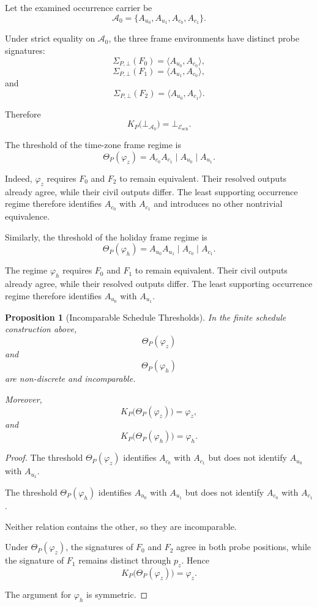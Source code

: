 \documentclass[11pt]{article}
\theoremstyle{plain}
\newtheorem{proposition}[theorem]{Proposition}
\theoremstyle{definition}
\theoremstyle{remark}
\begin{document}
Let the examined occurrence carrier be
\[
  \mathcal{A}_0
  =
  \{
  A_{u_0},
  A_{u_1},
  A_{c_0},
  A_{c_1}
  \}.
\]

Under strict equality on \(\mathcal{A}_0\),
the three frame environments have distinct probe signatures:
\[
  \Sigma_{P,\bot}(F_0)
  =
  \langle
  A_{u_0},
  A_{c_0}
  \rangle,
\]
\[
  \Sigma_{P,\bot}(F_1)
  =
  \langle
  A_{u_1},
  A_{c_0}
  \rangle,
\]
and
\[
  \Sigma_{P,\bot}(F_2)
  =
  \langle
  A_{u_0},
  A_{c_1}
  \rangle.
\]

Therefore
\[
  K_P
  \bigl(
  \bot_{\mathcal{A}_0}
  \bigr)
  =
  \bot_{\mathcal{E}_{\mathrm{sch}}}.
\]

The threshold of the time-zone frame regime is
\[
  \Theta_P(\varphi_z)
  =
  A_{c_0}A_{c_1}
  \mid
  A_{u_0}
  \mid
  A_{u_1}.
\]

Indeed,
\(\varphi_z\) requires \(F_0\) and \(F_2\)
to remain equivalent.
Their resolved outputs already agree,
while their civil outputs differ.
The least supporting occurrence regime
therefore identifies
\(A_{c_0}\) with \(A_{c_1}\)
and introduces no other nontrivial equivalence.

Similarly,
the threshold of the holiday frame regime is
\[
  \Theta_P(\varphi_h)
  =
  A_{u_0}A_{u_1}
  \mid
  A_{c_0}
  \mid
  A_{c_1}.
\]

The regime \(\varphi_h\)
requires \(F_0\) and \(F_1\)
to remain equivalent.
Their civil outputs already agree,
while their resolved outputs differ.
The least supporting occurrence regime
therefore identifies
\(A_{u_0}\) with \(A_{u_1}\).

\begin{proposition}[Incomparable Schedule Thresholds]
  \label{ik.prop.schedule-incomparable-thresholds}
  In the finite schedule construction above,
  \[
    \Theta_P(\varphi_z)
  \]
  and
  \[
    \Theta_P(\varphi_h)
  \]
  are non-discrete and incomparable.

  Moreover,
  \[
    K_P
    \bigl(
    \Theta_P(\varphi_z)
    \bigr)
    =
    \varphi_z,
  \]
  and
  \[
    K_P
    \bigl(
    \Theta_P(\varphi_h)
    \bigr)
    =
    \varphi_h.
  \]
\end{proposition}

\begin{proof}
  The threshold
  \(\Theta_P(\varphi_z)\)
  identifies
  \(A_{c_0}\) with \(A_{c_1}\)
  but does not identify
  \(A_{u_0}\) with \(A_{u_1}\).

  The threshold
  \(\Theta_P(\varphi_h)\)
  identifies
  \(A_{u_0}\) with \(A_{u_1}\)
  but does not identify
  \(A_{c_0}\) with \(A_{c_1}\).

  Neither relation contains the other,
  so they are incomparable.

  Under \(\Theta_P(\varphi_z)\),
  the signatures of \(F_0\) and \(F_2\)
  agree in both probe positions,
  while the signature of \(F_1\)
  remains distinct through \(p_z\).
  Hence
  \[
    K_P
    \bigl(
    \Theta_P(\varphi_z)
    \bigr)
    =
    \varphi_z.
  \]

  The argument for \(\varphi_h\)
  is symmetric.
\end{proof}
\end{document}
